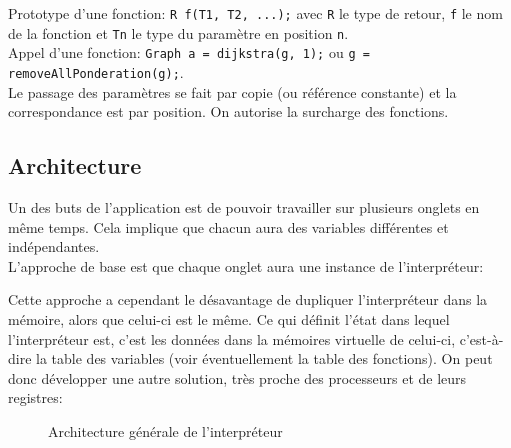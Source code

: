 \documentclass[french]{article}
\begin{document}
				Prototype d'une fonction: \texttt{R f(T1, T2, ...);} avec \texttt{R} le type de retour, \texttt{f} le nom de la fonction et \texttt{Tn} le type du paramètre en position \texttt{n}.\\
				
				Appel d'une fonction: \texttt{Graph a = dijkstra(g, 1);} ou \texttt{g = removeAllPonderation(g);}.\\
				
				Le passage des paramètres se fait par copie (ou référence constante) et la correspondance est par position. On autorise la surcharge des fonctions.
			
		\subsection{Architecture}
			Un des buts de l'application est de pouvoir travailler sur plusieurs onglets en même temps. Cela implique que chacun aura des variables différentes et indépendantes.\\
			
			L'approche de base est que chaque onglet aura une instance de l'interpréteur:
			
			\begin{figure}[H]
				\centering
			\end{figure}
			
			Cette approche a cependant le désavantage de dupliquer l'interpréteur dans la mémoire, alors que celui-ci est le même. Ce qui définit l'état dans lequel l'interpréteur est, c'est les données dans la mémoires virtuelle de celui-ci, c'est-à-dire la table des variables (voir éventuellement la table des fonctions). On peut donc développer une autre solution, très proche des processeurs et de leurs registres:
			
			\begin{figure}[H]
				\centering
				\caption{Architecture générale de l'interpréteur}
			\end{figure}
			
\end{document}
